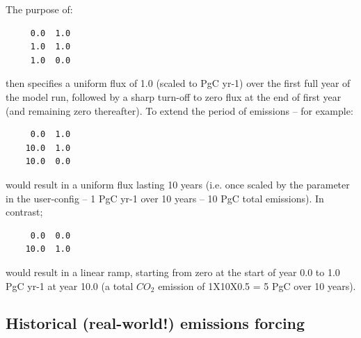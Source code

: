 \documentclass[11pt,fleqn]{book} %
\begin{document}
The purpose of: 
\vspace{-2pt}\begin{verbatim}
     0.0  1.0 
     1.0  1.0
     1.0  0.0
\end{verbatim}\vspace{-2pt}
then specifies a uniform flux of 1.0 (scaled to PgC yr-1) over the first full year of the model run, followed by a sharp turn-off to zero flux at the end of first year (and remaining zero thereafter). To extend the period of emissions – for example: 
\vspace{-2pt}\begin{verbatim}
     0.0  1.0 
    10.0  1.0
    10.0  0.0
\end{verbatim}\vspace{-2pt}
would result in a uniform flux lasting 10 years (i.e. once scaled by the parameter in the user-config – 1 PgC yr-1 over 10 years – 10 PgC total emissions). In contrast; 
\vspace{-2pt}\begin{verbatim}
     0.0  0.0
    10.0  1.0
\end{verbatim}\vspace{-2pt}
would result in a linear ramp, starting from zero at the start of year 0.0 to 1.0 PgC yr-1 at year 10.0 (a total \(CO_{2}\) emission of 1X10X0.5 = 5 PgC over 10 years). 


\subsection{Historical (real-world!) emissions forcing}
\end{document}
